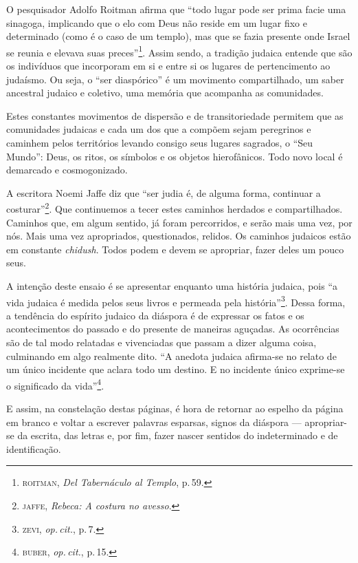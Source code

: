 O pesquisador Adolfo Roitman afirma que ``todo lugar pode ser
prima facie uma sinagoga, implicando que o elo com Deus não reside em um
lugar fixo e determinado (como é o caso de um templo), mas que se fazia
presente onde Israel se reunia e elevava suas preces''\footnote{\textsc{roitman},
  \emph{Del Tabernáculo al Templo}, p.\,59.}. Assim sendo, a tradição
judaica entende que são os indivíduos que incorporam em si e entre si os
lugares de pertencimento ao judaísmo. Ou seja, o ``ser diaspórico'' é um
movimento compartilhado, um saber ancestral judaico e coletivo, uma
memória que acompanha as comunidades.

Estes constantes movimentos de dispersão e de transitoriedade permitem
que as comunidades judaicas e cada um dos que a compõem sejam peregrinos
e caminhem pelos territórios levando consigo seus lugares sagrados, o
``Seu Mundo'': Deus, os ritos, os símbolos e os objetos hierofânicos.
Todo novo local é demarcado e cosmogonizado.

A escritora Noemi Jaffe diz que ``ser judia é, de alguma forma,
continuar a costurar''\footnote{\textsc{jaffe}, \emph{Rebeca: A costura no
  avesso}.}. Que continuemos a tecer estes caminhos herdados e
compartilhados. Caminhos que, em algum sentido, já foram percorridos, e
serão mais uma vez, por nós. Mais uma vez apropriados, questionados,
relidos. Os caminhos judaicos estão em constante \emph{chidush}. Todos
podem e devem se apropriar, fazer deles um pouco seus.

\begin{center}\end{center}

\noindent{}A intenção deste ensaio é se apresentar enquanto uma história judaica,
pois ``a vida judaica é medida pelos seus livros e permeada pela
história''\footnote{\textsc{zevi}, \emph{op.\,cit.}, p.\,7.}. Dessa forma, a tendência do
espírito judaico da diáspora é de expressar os fatos e os acontecimentos
do passado e do presente de maneiras aguçadas. As ocorrências são de tal
modo relatadas e vivenciadas que passam a dizer alguma coisa, culminando
em algo realmente dito. ``A anedota judaica afirma-se no relato de
um único incidente que aclara todo um destino. E no incidente único
exprime-se o significado da vida''\footnote{\textsc{buber}, \emph{op.\,cit.}, p.\,15.}.

E assim, na constelação destas páginas, é hora de retornar ao espelho da
página em branco e voltar a escrever palavras esparsas, signos da
diáspora --- apropriar-se da escrita, das letras e, por fim, fazer
nascer sentidos do indeterminado e de identificação.


